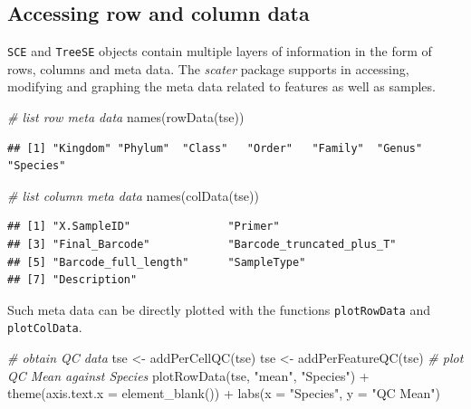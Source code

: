 \documentclass[
]{book}
\newenvironment{Shaded}{\begin{snugshade}}{\end{snugshade}}
\newcommand{\AttributeTok}[1]{\textcolor[rgb]{0.77,0.63,0.00}{#1}}
\newcommand{\CommentTok}[1]{\textcolor[rgb]{0.56,0.35,0.01}{\textit{#1}}}
\newcommand{\FunctionTok}[1]{\textcolor[rgb]{0.00,0.00,0.00}{#1}}
\newcommand{\NormalTok}[1]{#1}
\newcommand{\OtherTok}[1]{\textcolor[rgb]{0.56,0.35,0.01}{#1}}
\newcommand{\SpecialCharTok}[1]{\textcolor[rgb]{0.00,0.00,0.00}{#1}}
\newcommand{\StringTok}[1]{\textcolor[rgb]{0.31,0.60,0.02}{#1}}
\begin{document}
\hypertarget{accessing-row-and-column-data}{%
\subsection{Accessing row and column data}\label{accessing-row-and-column-data}}

\texttt{SCE} and \texttt{TreeSE} objects contain multiple layers of information in the
form of rows, columns and meta data. The \emph{scater} package supports in
accessing, modifying and graphing the meta data related to features as
well as samples.

\begin{Shaded}
\begin{Highlighting}[]
\CommentTok{\# list row meta data}
\FunctionTok{names}\NormalTok{(}\FunctionTok{rowData}\NormalTok{(tse))}
\end{Highlighting}
\end{Shaded}

\begin{verbatim}
## [1] "Kingdom" "Phylum"  "Class"   "Order"   "Family"  "Genus"   "Species"
\end{verbatim}

\begin{Shaded}
\begin{Highlighting}[]
\CommentTok{\# list column meta data}
\FunctionTok{names}\NormalTok{(}\FunctionTok{colData}\NormalTok{(tse))}
\end{Highlighting}
\end{Shaded}

\begin{verbatim}
## [1] "X.SampleID"               "Primer"                  
## [3] "Final_Barcode"            "Barcode_truncated_plus_T"
## [5] "Barcode_full_length"      "SampleType"              
## [7] "Description"
\end{verbatim}

Such meta data can be directly plotted with the functions
\texttt{plotRowData} and \texttt{plotColData}.

\begin{Shaded}
\begin{Highlighting}[]
\CommentTok{\# obtain QC data}
\NormalTok{tse }\OtherTok{\textless{}{-}} \FunctionTok{addPerCellQC}\NormalTok{(tse)}
\NormalTok{tse }\OtherTok{\textless{}{-}} \FunctionTok{addPerFeatureQC}\NormalTok{(tse)}
\CommentTok{\# plot QC Mean against Species}
\FunctionTok{plotRowData}\NormalTok{(tse, }\StringTok{"mean"}\NormalTok{, }\StringTok{"Species"}\NormalTok{) }\SpecialCharTok{+}
  \FunctionTok{theme}\NormalTok{(}\AttributeTok{axis.text.x =} \FunctionTok{element\_blank}\NormalTok{()) }\SpecialCharTok{+}
  \FunctionTok{labs}\NormalTok{(}\AttributeTok{x =} \StringTok{"Species"}\NormalTok{, }\AttributeTok{y =} \StringTok{"QC Mean"}\NormalTok{)}
\end{Highlighting}
\end{Shaded}
\end{document}
